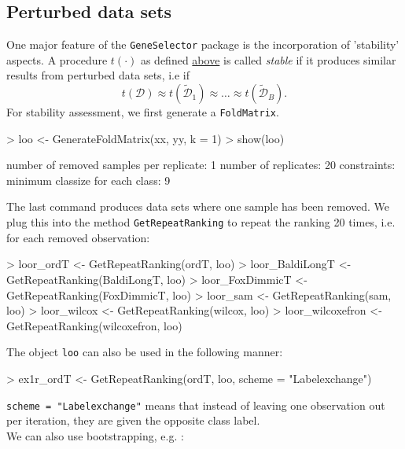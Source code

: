 \subsection{Perturbed data sets}
One major feature of the {\tt GeneSelector} package  is the incorporation of
'stability' aspects. A procedure $t(\cdot)$ as
defined \hyperlink{procedure}{above} is called \emph{stable}
if it produces similar results from perturbed data sets, i.e if
\begin{equation*}
t(\mathcal{D}) \approx t(\widetilde{\mathcal{D}}_1)  \approx \ldots
\approx t(\widetilde{\mathcal{D}}_B).
\end{equation*}
For stability assessment, we first generate a \texttt{FoldMatrix}.

\begin{Schunk}
\begin{Sinput}
> loo <- GenerateFoldMatrix(xx, yy, k = 1)
> show(loo)
\end{Sinput}
\begin{Soutput}
number of removed samples per replicate: 1
number of replicates: 20
constraints: minimum classize for each class: 9
\end{Soutput}
\end{Schunk}

The last command produces data sets where one sample has been removed.
We plug this into the method \texttt{GetRepeatRanking} to repeat
the ranking 20 times, i.e. for each removed observation:

\begin{Schunk}
\begin{Sinput}
> loor_ordT <- GetRepeatRanking(ordT, loo)
> loor_BaldiLongT <- GetRepeatRanking(BaldiLongT, loo)
> loor_FoxDimmicT <- GetRepeatRanking(FoxDimmicT, loo)
> loor_sam <- GetRepeatRanking(sam, loo)
> loor_wilcox <- GetRepeatRanking(wilcox, loo)
> loor_wilcoxefron <- GetRepeatRanking(wilcoxefron, loo)
\end{Sinput}
\end{Schunk}

The object \texttt{loo} can also be used in the following manner:

\begin{Schunk}
\begin{Sinput}
> ex1r_ordT <- GetRepeatRanking(ordT, loo, scheme = "Labelexchange")
\end{Sinput}
\end{Schunk}

\texttt{scheme = "Labelexchange"} means that instead of leaving one observation
out per iteration, they are given the opposite class label.\\
We can also use bootstrapping, e.g. :

